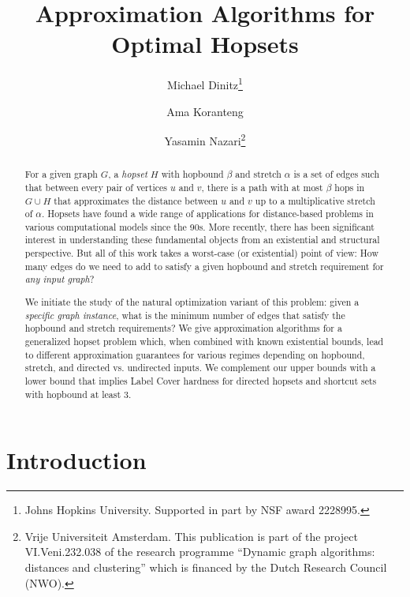 \documentclass{article}
\title{Approximation Algorithms for Optimal Hopsets}
\author{Michael Dinitz\thanks{Johns Hopkins University.  Supported in part by NSF award 2228995.} \and Ama Koranteng\footnotemark[1] \and Yasamin Nazari\thanks{Vrije Universiteit Amsterdam.  This publication is part of the project VI.Veni.232.038 of the research programme ``Dynamic graph algorithms: distances and clustering'' which is financed by the Dutch Research Council (NWO).}}
\date{}
\theoremstyle{definition}
\theoremstyle{remark}
\begin{document}
\maketitle

\begin{abstract}
  For a given graph $G$, a \emph{hopset} $H$ with hopbound $\beta$ and stretch $\alpha$ is a set of edges such that between every pair of vertices $u$ and $v$, there is a path with at most $\beta$ hops in $G \cup H$ that approximates the distance between $u$ and $v$ up to a multiplicative stretch of $\alpha$. Hopsets have found a wide range of applications for distance-based problems in various computational models since the 90s. More recently, there has been significant interest in understanding these fundamental objects from an existential and structural perspective. 
  But all of this work takes a worst-case (or existential) point of view: How many edges do we need to add to satisfy a given hopbound and stretch requirement for \emph{any input graph}?
  
  We initiate the study of the natural optimization variant of this problem: given a \emph{specific graph instance}, what is the minimum number of edges that satisfy the hopbound and stretch requirements? We give approximation algorithms for a generalized hopset problem which, when combined with known existential bounds, lead to different approximation guarantees for various regimes depending on hopbound, stretch, and directed vs. undirected inputs.
  We complement our upper bounds with a lower bound that implies Label Cover hardness for directed hopsets and shortcut sets with hopbound at least $3$. 
\end{abstract}

\section{Introduction}
\end{document}
